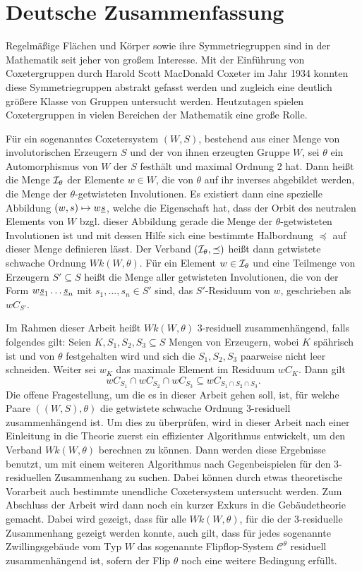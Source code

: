 \chapter*{Deutsche Zusammenfassung}

Regelmäßige Flächen und Körper sowie ihre Symmetriegruppen sind in der Mathematik seit jeher von großem Interesse. Mit der Einführung von Coxetergruppen durch Harold Scott MacDonald Coxeter im Jahr 1934 konnten diese Symmetriegruppen abstrakt gefasst werden und zugleich eine deutlich größere Klasse von Gruppen untersucht werden. Heutzutagen spielen Coxetergruppen in vielen Bereichen der Mathematik eine große Rolle.

Für ein sogenanntes Coxetersystem $(W,S)$, bestehend aus einer Menge von involutorischen Erzeugern $S$ und der von ihnen erzeugten Gruppe $W$, sei $\theta$ ein Automorphismus von $W$ der $S$ festhält und maximal Ordnung 2 hat. Dann heißt die Menge $\mathcal{I}_{\theta}$ der Elemente $w \in W$, die von $\theta$ auf ihr inverses abgebildet werden, die Menge der $\theta$-getwisteten Involutionen. Es existiert dann eine spezielle Abbildung $(w,s) \mapsto w \underline{s}$, welche die Eigenschaft hat, dass der Orbit des neutralen Elements von $W$ bzgl. dieser Abbildung gerade die Menge der $\theta$-getwisteten Involutionen ist und mit dessen Hilfe sich eine bestimmte Halbordnung $\preceq$ auf dieser Menge definieren lässt. Der Verband $(\mathcal{I}_{\theta},\preceq)$ heißt dann getwistete schwache Ordnung $Wk(W,\theta)$. Für ein Element $w \in \mathcal{I}_{\theta}$ und eine Teilmenge von Erzeugern $S' \subseteq S$ heißt die Menge aller getwisteten Involutionen, die von der Form $w \underline{s}_1 \ldots \underline{s}_n$ mit $s_1,\ldots,s_n \in S'$ sind, das $S'$-Residuum von $w$, geschrieben als $w C_{S'}$.

Im Rahmen dieser Arbeit heißt $Wk(W,\theta)$ 3-residuell zusammenhängend, falls folgendes gilt: Seien $K,S_1,S_2,S_3 \subseteq S$ Mengen von Erzeugern, wobei $K$ spährisch ist und von $\theta$ festgehalten wird und sich die $S_1,S_2,S_3$ paarweise nicht leer schneiden. Weiter sei $w_K$ das maximale Element im Residuum $w C_K$. Dann gilt
$$ w C_{S_1} \cap w C_{S_2} \cap w C_{S_3} \subseteq w C_{S_1 \cap S_2 \cap S_3}. $$
Die offene Fragestellung, um die es in dieser Arbeit gehen soll, ist, für welche Paare $((W,S),\theta)$ die getwistete schwache Ordnung 3-residuell zusammenhängend ist. Um dies zu überprüfen, wird in dieser Arbeit nach einer Einleitung in die Theorie zuerst ein effizienter Algorithmus entwickelt, um den Verband $Wk(W,\theta)$ berechnen zu können. Dann werden diese Ergebnisse benutzt, um mit einem weiteren Algorithmus nach Gegenbeispielen für den 3-residuellen Zusammenhang zu suchen. Dabei können durch etwas theoretische Vorarbeit auch bestimmte unendliche Coxetersystem untersucht werden. Zum Abschluss der Arbeit wird dann noch ein kurzer Exkurs in die Gebäudetheorie gemacht. Dabei wird gezeigt, dass für alle $Wk(W,\theta)$, für die der 3-residuelle Zusammenhang gezeigt werden konnte, auch gilt, dass für jedes sogenannte Zwillingsgebäude vom Typ $W$ das sogenannte Flipflop-System $\mathcal{C}^\theta$ residuell zusammenhängend ist, sofern der Flip $\theta$ noch eine weitere Bedingung erfüllt.